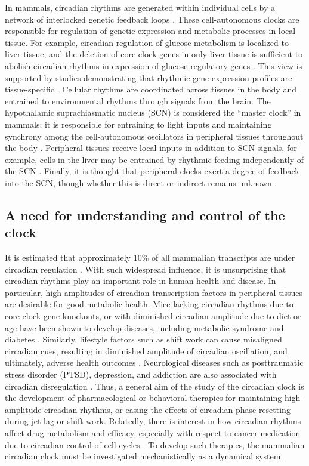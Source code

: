 In mammals, circadian rhythms are generated within individual cells by a network of interlocked genetic feedback loops \cite{Dunlap1999, Ko2006, Mohawk2012}.
These cell-autonomous clocks are responsible for regulation of genetic expression and metabolic processes in local tissue.
For example, circadian regulation of glucose metabolism is localized to liver tissue, and the deletion of core clock genes in only liver tissue is sufficient to abolish circadian rhythms in expression of glucose regulatory genes \cite{Lamia2008a}.
This view is supported by studies demonstrating that rhythmic gene expression profiles are tissue-specific \cite{Panda2002, Ueda2002}.
Cellular rhythms are coordinated across tissues in the body and entrained to environmental rhythms through signals from the brain.
The hypothalamic suprachiasmatic nucleus (SCN) is considered the ``master clock'' in mammals: it is responsible for entraining to light inputs and maintaining synchrony among the cell-autonomous oscillators in peripheral tissues throughout the body \cite{Welsh2010}.
Peripheral tissues receive local inputs in addition to SCN signals, for example, cells in the liver may be entrained by rhythmic feeding independently of the SCN \cite{Stokkan2001}.
Finally, it is thought that peripheral clocks exert a degree of feedback into the SCN, though whether this is direct or indirect remains unknown \cite{Green2008}.

\subsection*{A need for understanding and control of the clock}
It is estimated that approximately 10\% of all mammalian transcripts are under circadian regulation \cite{Lowrey2004}.
With such widespread influence, it is unsurprising that circadian rhythms play an important role in human health and disease.
In particular, high amplitudes of circadian transcription factors in peripheral tissues are desirable for good metabolic health.
Mice lacking circadian rhythms due to core clock gene knockouts, or with diminished circadian amplitude due to diet or age have been shown to develop diseases, including metabolic syndrome and diabetes \cite{Marcheva2010, Hatori2012, Chang2013}.
Similarly, lifestyle factors such as shift work can cause misaligned circadian cues, resulting in diminished amplitude of circadian oscillation, and ultimately, adverse health outcomes \cite{Green2008, Pan2011, Mukherji2015}.
Neurological diseases such as posttraumatic stress disorder (PTSD), depression, and addiction are also associated with circadian disregulation  \cite{Wulff2010,Yehuda1996, Rosenwasser2010}.
Thus, a general aim of the study of the circadian clock is the development of pharmacological or behavioral therapies for maintaining high-amplitude circadian rhythms, or easing the effects of circadian phase resetting during jet-lag or shift work.
Relatedly, there is interest in how circadian rhythms affect drug metabolism and efficacy, especially with respect to cancer medication due to circadian control of cell cycles \cite{Lemmer1991, Levi2010}.
To develop such therapies, the mammalian circadian clock must be investigated mechanistically as a dynamical system.



